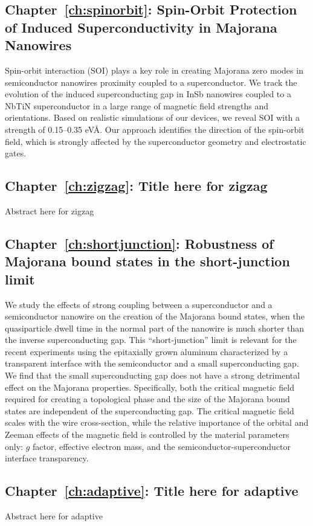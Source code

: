 \subsection{Chapter~\ref{ch:spinorbit}: Spin-Orbit Protection of Induced Superconductivity in Majorana Nanowires}
Spin-orbit interaction (SOI) plays a key role in creating Majorana zero modes in semiconductor nanowires proximity coupled to a superconductor.
We track the evolution of the induced superconducting gap in InSb nanowires coupled to a NbTiN superconductor in a large range of magnetic field strengths and orientations.
Based on realistic simulations of our devices, we reveal SOI with a strength of 0.15--0.35 eV\AA.
Our approach identifies the direction of the spin-orbit field, which is strongly affected by the superconductor geometry and electrostatic gates.
\vspace{1mm}

\subsection{Chapter~\ref{ch:zigzag}: Title here for zigzag}
Abstract here for zigzag
\vspace{1mm}

\subsection{Chapter~\ref{ch:shortjunction}: Robustness of Majorana bound states in the short-junction limit}
We study the effects of strong coupling between a superconductor and a semiconductor nanowire on the creation of the Majorana bound states, when the quasiparticle dwell time in the normal part of the nanowire is much shorter than the inverse superconducting gap.
This ``short-junction'' limit is relevant for the recent experiments using the epitaxially grown aluminum characterized by a transparent interface with the semiconductor and a small superconducting gap.
We find that the small superconducting gap does not have a strong detrimental effect on the Majorana properties.
Specifically, both the critical magnetic field required for creating a topological phase and the size of the Majorana bound states are independent of the superconducting gap.
The critical magnetic field scales with the wire cross-section, while the relative importance of the orbital and Zeeman effects of the magnetic field is controlled by the material parameters only: $g$ factor, effective electron mass, and the semiconductor-superconductor interface transparency.

\subsection{Chapter~\ref{ch:adaptive}: Title here for adaptive}
Abstract here for adaptive
\vspace{1mm}

